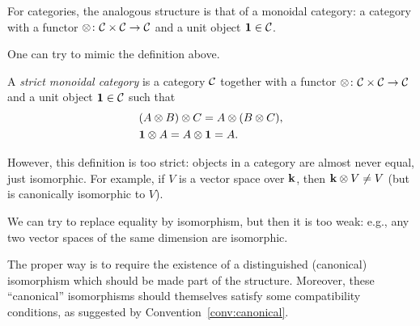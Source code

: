 For categories, the analogous structure is that of a monoidal category: a
category with a functor $\otimes \colon \mathcal{C}\times \mathcal{C}\to \mathcal{C}$ and a unit
object $\mathbf{1}\in \mathcal{C}$.

One can try to mimic the definition above.
\begin{definition}\label{d:strict_monoidal}
  A \emph{strict monoidal category} is a
  category $\mathcal{C}$ together with a functor $\otimes \colon \mathcal{C}\times \mathcal{C}\to
  \mathcal{C}$ and a unit object $\mathbf{1}\in \mathcal{C}$ such that
  \begin{align*}
    &(A\otimes B)\otimes  C = A\otimes  (B\otimes C),\\
    &\mathbf{1} \otimes A  = A\otimes \mathbf{1}   = A.
  \end{align*}
\end{definition}

However, this definition is too strict: objects in a category are almost never
equal, just isomorphic. For example, if $V$ is a vector space over $\mathbf{k}$, then
$\mathbf{k}\otimes V\ne V$ (but is canonically isomorphic to $V$).

We can try to replace equality by isomorphism, but then it is too weak: e.g.,
any two vector spaces of the same dimension are isomorphic.

The proper way is to require the existence of a distinguished (canonical)
isomorphism which should be made part of the structure. Moreover, these
``canonical'' isomorphisms should themselves satisfy some compatibility
conditions, as suggested by Convention~\ref{conv:canonical}.

